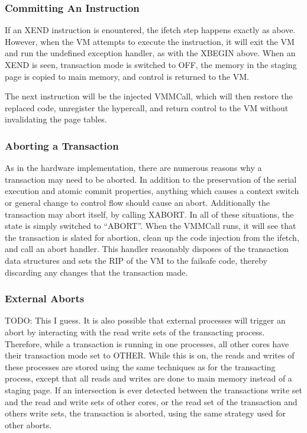 \documentclass{acm_proc_article-sp}
\begin{document}
\subsubsection{Committing An Instruction}

If an XEND instruction is enountered, the ifetch step happens exactly as above.
However, when the VM attempts to execute the instruction, it will exit the VM
and run the undefined exception handler, as with the XBEGIN above. When an XEND
is seen, transaction mode is switched to OFF, the memory in the staging page is
copied to main memory, and control is returned to the VM.

The next instruction will be the injected VMMCall, which will then restore the
replaced code, unregister the hypercall, and return control to the VM without
invalidating the page tables.

\subsubsection{Aborting a Transaction}

As in the hardware implementation, there are numerous reasons why a transaction
may need to be aborted. In addition to the preservation of the serial execution
and atomic commit properties, anything which causes a context switch or general
change to control flow should cause an abort. Additionally the transaction may
abort itself, by calling XABORT. In all of these situations, the state is 
simply switched to ``ABORT''. When the VMMCall runs, it will see that the 
transaction is slated for abortion, clean up the code injection from the ifetch,
and call an abort handler. This handler reasonably disposes of the transaction
data structures and sets the RIP of the VM to the failsafe code, thereby
discarding any changes that the transaction made. 

\subsubsection{External Aborts}

TODO: This I guess.
It is also possible that external processes will trigger an abort by 
interacting with the read write sets of the transacting process. Therefore, 
while a transaction is running in one processes, all other cores have their
transaction mode set to OTHER. While this is on, the reads and writes of 
these processes are stored using the same techniques as for the transacting
process, except that all reads and writes are done to main memory instead of a 
staging page. If an intersection is ever detected between the transactions
write set and the read and write sets of other cores, or the read set of the
transaction and others write sets, the transaction is aborted, using the same
strategy used for other aborts.  
\end{document}
